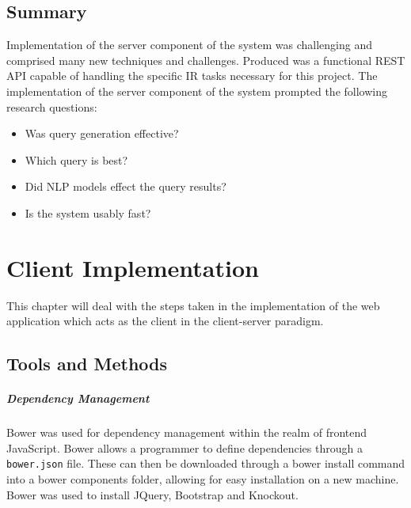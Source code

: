 \documentclass{l4proj}
\newcommand{\code}[1]{\texttt{#1}}
\begin{document}
\section{Summary} \label{serversummary}
Implementation of the server component of the system was challenging and comprised many new techniques and challenges. Produced was a functional REST API capable of handling the specific IR tasks necessary for this project.
The implementation of the server component of the system prompted the following research questions:
\begin{itemize}
\item Was query generation effective?
\item Which query is best?
\item Did NLP models effect the query results?
\item Is the system usably fast?
\end{itemize}

\chapter{Client Implementation} \label{clientimplementation}
This chapter will deal with the steps taken in the implementation of the web application which acts as the client in the client-server paradigm.

\section{Tools and Methods}
\paragraph{Dependency Management}
Bower was used for dependency management within the realm of frontend JavaScript. Bower allows a programmer to define dependencies through a \code{bower.json} file. These can then be downloaded through a bower install command into a bower components folder, allowing for easy installation on a new machine. Bower was used to install JQuery, Bootstrap and Knockout.
\end{document}
